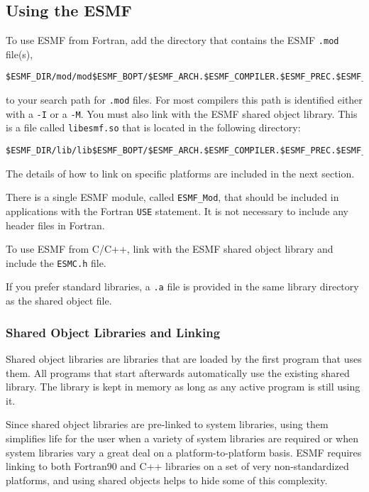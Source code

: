 
\subsection{Using the ESMF}
\label{UsingLibrary}

To use ESMF from Fortran, add the directory that contains
the ESMF {\tt *.mod} file(s),

\begin{verbatim}
$ESMF_DIR/mod/mod$ESMF_BOPT/$ESMF_ARCH.$ESMF_COMPILER.$ESMF_PREC.$ESMF_SITE
\end{verbatim} 

to your search path for {\tt *.mod} files.  For most compilers this path 
is identified either with a {\tt -I} or a {\tt -M}.  You must also link 
with the ESMF shared object library.  This is a file called 
{\tt libesmf.so} that is located in the following directory:

\begin{verbatim}
$ESMF_DIR/lib/lib$ESMF_BOPT/$ESMF_ARCH.$ESMF_COMPILER.$ESMF_PREC.$ESMF_SITE
\end{verbatim} 

The details of how to link on specific platforms are included in the 
next section.

There is a single ESMF module, called {\tt ESMF\_Mod}, that should be 
included in applications with the Fortran {\tt USE} statement.  It 
is not necessary to include any header files in Fortran.

To use ESMF from C/C++, link with the ESMF shared object library 
and include the {\tt ESMC.h} file. 

If you prefer standard libraries, a {\tt *.a} file is provided  
in the same library directory as the shared object file.  

\subsubsection{Shared Object Libraries and Linking}

Shared object libraries are libraries that are loaded by the first program 
that uses them. All programs that start afterwards automatically use the 
existing shared library. The library is kept in memory as long as any 
active program is still using it. 

Since shared object libraries are pre-linked to system libraries, using them
simplifies life for the user when a variety of system libraries are
required or when system libraries vary a great deal on a 
platform-to-platform basis.  ESMF requires linking to both Fortran90 and
C++ libraries on a set of very non-standardized platforms, and using
shared objects helps to hide some of this complexity.

